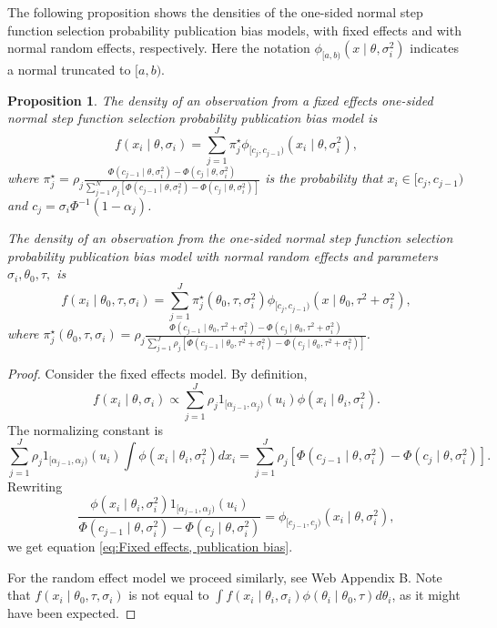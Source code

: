 \documentclass[useAMS,usenatbib,referee]{biom}
\newtheorem{prop}[theorem]{Proposition}
\begin{document}
The following proposition shows the densities of the one-sided normal step function selection probability publication bias models, with fixed effects and with normal random effects, respectively. Here the notation $\phi_{[a,b)}(x\mid\theta,\sigma_i^2)$ indicates a normal truncated to $[a,b)$.
\begin{prop}
\label{prop:One-sided normal discrete probability vector publication bias model-1}
The density of an observation from a fixed effects one-sided normal step function selection probability publication bias model is
\begin{equation}\label{eq:Fixed effects, publication bias}
f(x_{i}\mid\theta,\sigma_{i}) = \sum_{j=1}^{J}\pi_{j}^\star\phi_{[c_j,c_{j-1})}(x_{i}\mid\theta,\sigma_{i}^2),
\end{equation}
where $\pi_{j}^{\star}=\rho_{j}\frac{\Phi(c_{j-1}\mid\theta,\sigma_{i}^2)-\Phi(c_{j}\mid\theta,\sigma_{i}^2)}{\sum_{j=1}^{N}\rho_{j}\left[\Phi(c_{j-1}\mid\theta,\sigma_{i}^2)-\Phi(c_{j}\mid\theta,\sigma_{i}^2)\right]}$ is the probability that $x_i \in [c_j,c_{j-1})$ and $c_{j}=\sigma_i\Phi^{-1}(1-\alpha_{j})$.

The density of an observation from the one-sided normal step function selection probability publication bias model with normal random effects and parameters $\sigma_{i},\theta_{0},\tau,$ is
\begin{equation}\label{eq:Random effects, publication bias}
f(x_i\mid\theta_{0},\tau,\sigma_{i})=\sum_{j=1}^{J}\pi_{j}^{\star}(\theta_0,\tau,\sigma^2_{i})\phi_{[c_j,c_{j-1})}(x\mid\theta_{0},\tau^{2}+\sigma_{i}^{2}),
\end{equation}
where $\pi_{j}^{\star}(\theta_0,\tau,\sigma_{i})=\rho_{j}\frac{\Phi(c_{j-1}\mid\theta_{0},\tau^{2}+\sigma_{i}^{2})-\Phi(c_{j}\mid\theta_{0},\tau^{2}+\sigma_{i}^{2})}{\sum_{j=1}^{J}\rho_{j}\left[\Phi(c_{j-1}\mid\theta_{0},\tau^{2}+\sigma_{i}^{2})-\Phi(c_{j}\mid\theta_{0},\tau^{2}+\sigma_{i}^{2})\right]}$.
\end{prop}

\begin{proof}
Consider the fixed effects model. By definition,
\[
f(x_{i}\mid\theta,\sigma_{i})\propto\sum_{j=1}^{J}\rho_{j}1_{[\alpha_{j-1},\alpha_{j})}(u_{i})\phi(x_{i}\mid\theta_{i},\sigma_{i}^{2}).
\]
The normalizing constant is
\[
\sum_{j=1}^{J}\rho_{j}1_{[\alpha_{j-1},\alpha_{j})}(u_{i})\int\phi(x_{i}\mid\theta_{i},\sigma_{i}^{2})dx_{i}=\sum_{j=1}^{J}\rho_{j}\left[\Phi(c_{j-1}\mid\theta,\sigma_{i}^{2})-\Phi(c_{j}\mid\theta,\sigma_{i}^{2})\right].
\]
Rewriting
\[
\frac{\phi(x_{i}\mid\theta_{i},\sigma^2_{i})1_{[\alpha_{j-1},\alpha_{j})}(u_{i})}{\Phi(c_{j-1}\mid\theta,\sigma^2_{i})-\Phi(c_{j}\mid\theta,\sigma^2_{i})}=\phi_{[c_{j-1},c_{j})}(x_{i}\mid\theta,\sigma^2_{i}),
\]
we get equation \eqref{eq:Fixed effects, publication bias}. 

For the random effect model we proceed similarly, see Web Appendix B. Note that $f(x_i\mid\theta_{0},\tau,\sigma_i)$ is not equal to $\int f(x_{i}\mid\theta_{i},\sigma_{i})\phi(\theta_{i}\mid\theta_{0},\tau)d\theta_{i}$, as it might have been expected.
\end{proof}
\end{document}
